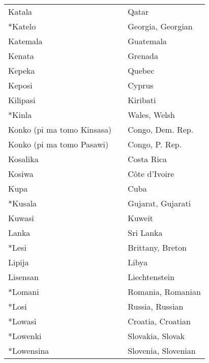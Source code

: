 \begin{supertabular}{p{4,5cm}|ll}
    Katala                     &  & Qatar                           \\
    *Katelo                    &  & Georgia, Georgian               \\
    Katemala                   &  & Guatemala                       \\
    Kenata                     &  & Grenada                         \\
    Kepeka                     &  & Quebec                          \\
    Keposi                     &  & Cyprus                          \\
    Kilipasi                   &  & Kiribati                        \\
    *Kinla                     &  & Wales, Welsh                    \\
    Konko (pi ma tomo Kinsasa) &  & Congo, Dem. Rep.                \\
    Konko (pi ma tomo Pasawi)  &  & Congo, P. Rep.                  \\
    Kosalika                   &  & Costa Rica                      \\
    Kosiwa                     &  & Côte d'Ivoire                   \\
    Kupa                       &  & Cuba                            \\
    *Kusala                    &  & Gujarat, Gujarati               \\
    Kuwasi                     &  & Kuweit                          \\
    Lanka                      &  & Sri Lanka                       \\
    *Lesi                      &  & Brittany, Breton                \\
    Lipija                     &  & Libya                           \\
    Lisensan                   &  & Liechtenstein                   \\
    *Lomani                    &  & Romania, Romanian               \\
    *Losi                      &  & Russia, Russian                 \\
    *Lowasi                    &  & Croatia, Croatian               \\
    *Lowenki                   &  & Slovakia, Slovak                \\
    *Lowensina                 &  & Slovenia, Slovenian             \\

\end{supertabular}

